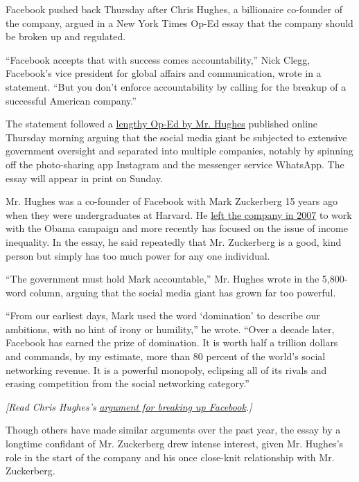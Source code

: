 Facebook pushed back Thursday after Chris Hughes, a billionaire
co-founder of the company, argued in a New York Times Op-Ed essay that
the company should be broken up and regulated.

``Facebook accepts that with success comes accountability,'' Nick Clegg,
Facebook's vice president for global affairs and communication, wrote in
a statement. ``But you don't enforce accountability by calling for the
breakup of a successful American company.''

The statement followed a
\href{https://www.nytimes3xbfgragh.onion/2019/05/09/opinion/sunday/chris-hughes-facebook-zuckerberg.html}{lengthy
Op-Ed by Mr. Hughes} published online Thursday morning arguing that the
social media giant be subjected to extensive government oversight and
separated into multiple companies, notably by spinning off the
photo-sharing app Instagram and the messenger service WhatsApp. The
essay will appear in print on Sunday.

Mr. Hughes was a co-founder of Facebook with Mark Zuckerberg 15 years
ago when they were undergraduates at Harvard. He
\href{http://www.pbs.org/wnet/need-to-know/the-daily-need/the-facebook-co-founder-who-got-away/3847/}{left
the company in 2007} to work with the Obama campaign and more recently
has focused on the issue of income inequality. In the essay, he said
repeatedly that Mr. Zuckerberg is a good, kind person but simply has too
much power for any one individual.

``The government must hold Mark accountable,'' Mr. Hughes wrote in the
5,800-word column, arguing that the social media giant has grown far too
powerful.

``From our earliest days, Mark used the word `domination' to describe
our ambitions, with no hint of irony or humility,'' he wrote. ``Over a
decade later, Facebook has earned the prize of domination. It is worth
half a trillion dollars and commands, by my estimate, more than 80
percent of the world's social networking revenue. It is a powerful
monopoly, eclipsing all of its rivals and erasing competition from the
social networking category.''

\emph{{[}Read Chris Hughes's}
\href{https://www.nytimes3xbfgragh.onion/2019/05/09/opinion/sunday/chris-hughes-facebook-zuckerberg.html?action=click\&module=Intentional\&pgtype=Article}{\emph{argument
for breaking up Facebook}}\emph{.{]}}

Though others have made similar arguments over the past year, the essay
by a longtime confidant of Mr. Zuckerberg drew intense interest, given
Mr. Hughes's role in the start of the company and his once close-knit
relationship with Mr. Zuckerberg.

